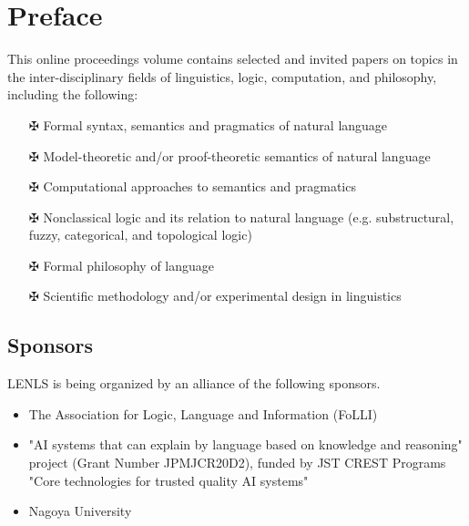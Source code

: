 \documentclass[12pt]{jarticle}
\begin{document}
\newpage

\vspace*{20cm}
\vfill
\begin{large}

\end{large}

\newpage
\pagestyle{plain}

\newpage
\section*{Preface}
This online proceedings volume contains selected and invited papers on topics in the inter-disciplinary fields of linguistics, logic, computation, and philosophy, including the following:
\begin{itemize}
\item[$\maltese$] Formal syntax, semantics and pragmatics of natural language
\item[$\maltese$] Model-theoretic and/or proof-theoretic semantics of natural language
\item[$\maltese$] Computational approaches to semantics and pragmatics
\item[$\maltese$] Nonclassical logic and its relation to natural language 
  (e.g. substructural, fuzzy, categorical, and topological logic)
\item[$\maltese$] Formal philosophy of language
\item[$\maltese$] Scientific methodology and/or experimental design in linguistics
\end{itemize}

\subsection*{Sponsors}
LENLS is being organized by an alliance of the following sponsors.
\begin{itemize}
\item The Association for Logic, Language and Information (FoLLI)
\item "AI systems that can explain by language based on knowledge and reasoning" project (Grant Number JPMJCR20D2), funded by JST CREST Programs "Core technologies for trusted quality AI systems"
\item Nagoya University
\end{itemize}
\end{document}

